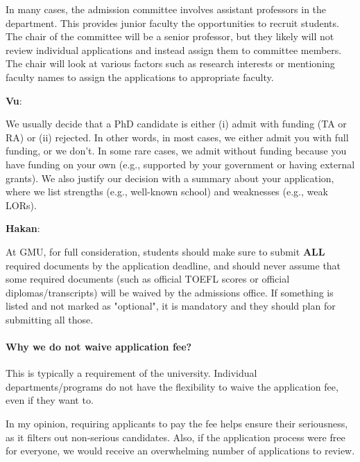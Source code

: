 \documentclass[11pt]{article}
\newenvironment{commentbox}[1][]{
\small
    \begin{cbox}
    \textbf{#1}: 
 }{
   \end{cbox}
}
\newcommand{\mycomment}[3][\color{blue}]{{#1{{#2}: {#3}}}}
\newcommand{\didi}[1]{\mycomment{Didier}{#1}}{}
\begin{document}
In many cases, the admission committee involves assistant professors in the department. This provides junior faculty the opportunities to recruit students. The chair of the committee will be a senior professor, but they likely will not review individual applications and instead assign them to committee members. The chair will look at various factors such as research interests or mentioning faculty names to assign the applications to appropriate faculty. 

\begin{commentbox}[Vu] 
We usually decide that a PhD candidate is either (i) admit with funding (TA or RA) or (ii) rejected. In other words, in most cases, we either
admit you with full funding, or we don't. In some rare cases, we admit
without funding because you have funding on your own (e.g.,
supported by your government or having external grants). We also justify
our decision with a summary about your application, where we list
strengths (e.g., well-known school) and weaknesses (e.g., weak
LORs). 
\end{commentbox}


\begin{commentbox}[Hakan]
At GMU, for full consideration, students should make sure to submit \textbf{ALL} required documents by the application deadline, and should never assume that some required documents (such as official TOEFL scores or official diplomas/transcripts) will be waived by the admissions office. If something is listed and not marked as "optional", it is mandatory and they should plan for submitting all those.  
\end{commentbox}
\paragraph{Why we do not waive application fee?}  This is typically a requirement of the university. Individual departments/programs do not have the flexibility to waive the application fee, even if they want to. 

In my opinion, requiring applicants to pay the fee helps ensure their seriousness, as it filters out non-serious candidates. Also, if the application process were free for everyone, we would receive an overwhelming number of applications to review.
\end{document}
